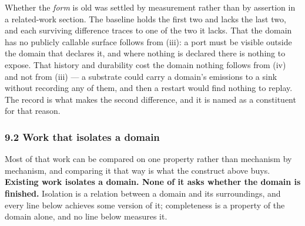 \documentclass[
]{article}
\begin{document}
Whether the \emph{form} is old was settled by measurement rather than by
assertion in a related-work section. The baseline holds the first two
and lacks the last two, and each surviving difference traces to one of
the two it lacks. That the domain has no publicly callable surface
follows from (iii): a port must be visible outside the domain that
declares it, and where nothing is declared there is nothing to expose.
That history and durability cost the domain nothing follows from (iv)
and not from (iii) --- a substrate could carry a domain's emissions to a
sink without recording any of them, and then a restart would find
nothing to replay. The record is what makes the second difference, and
it is named as a constituent for that reason.

\subsubsection{9.2 Work that isolates a
domain}\label{work-that-isolates-a-domain}

Most of that work can be compared on one property rather than mechanism
by mechanism, and comparing it that way is what the construct above
buys. \textbf{Existing work isolates a domain. None of it asks whether
the domain is finished.} Isolation is a relation between a domain and
its surroundings, and every line below achieves some version of it;
completeness is a property of the domain alone, and no line below
measures it.
\end{document}
